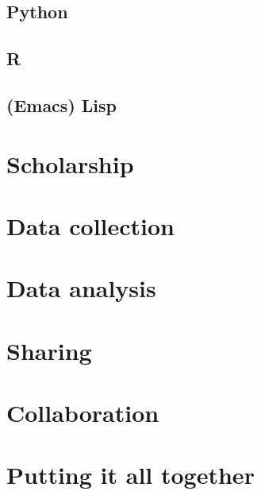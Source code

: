 \documentclass{book}
\begin{document}
\subsection{Python}
\label{sec-10-2-5}
\subsection{R}
\label{sec-10-2-6}
\subsection{(Emacs) Lisp}
\label{sec-10-2-7}
\section{Scholarship}
\label{sec-10-3}
\section{Data collection}
\label{sec-10-4}
\section{Data analysis}
\label{sec-10-5}
\section{Sharing}
\label{sec-10-6}
\section{Collaboration}
\label{sec-10-7}
\section{Putting it all together}
\label{sec-10-8}


\printbibliography
\end{document}
